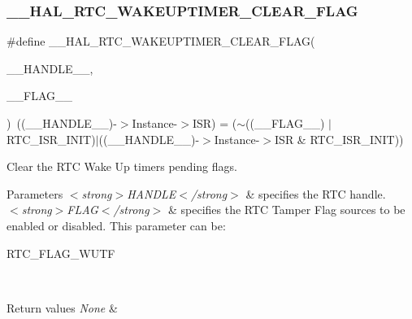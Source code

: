 \subsubsection{\texorpdfstring{\+\_\+\+\_\+\+H\+A\+L\+\_\+\+R\+T\+C\+\_\+\+W\+A\+K\+E\+U\+P\+T\+I\+M\+E\+R\+\_\+\+C\+L\+E\+A\+R\+\_\+\+F\+L\+AG}{\_\_HAL\_RTC\_WAKEUPTIMER\_CLEAR\_FLAG}}
{\footnotesize\ttfamily \#define \+\_\+\+\_\+\+H\+A\+L\+\_\+\+R\+T\+C\+\_\+\+W\+A\+K\+E\+U\+P\+T\+I\+M\+E\+R\+\_\+\+C\+L\+E\+A\+R\+\_\+\+F\+L\+AG(\begin{DoxyParamCaption}\item[{}]{\+\_\+\+\_\+\+H\+A\+N\+D\+L\+E\+\_\+\+\_\+,  }\item[{}]{\+\_\+\+\_\+\+F\+L\+A\+G\+\_\+\+\_\+ }\end{DoxyParamCaption})~((\+\_\+\+\_\+\+H\+A\+N\+D\+L\+E\+\_\+\+\_\+)-\/$>$Instance-\/$>$I\+SR) = ($\sim$((\+\_\+\+\_\+\+F\+L\+A\+G\+\_\+\+\_\+) $\vert$ R\+T\+C\+\_\+\+I\+S\+R\+\_\+\+I\+N\+IT)$\vert$((\+\_\+\+\_\+\+H\+A\+N\+D\+L\+E\+\_\+\+\_\+)-\/$>$Instance-\/$>$I\+SR \& R\+T\+C\+\_\+\+I\+S\+R\+\_\+\+I\+N\+IT))}



Clear the R\+TC Wake Up timer\textquotesingle{}s pending flags. 


\begin{DoxyParams}{Parameters}
{\em $<$strong$>$\+H\+A\+N\+D\+L\+E$<$/strong$>$} & specifies the R\+TC handle. \\
\hline
{\em $<$strong$>$\+F\+L\+A\+G$<$/strong$>$} & specifies the R\+TC Tamper Flag sources to be enabled or disabled. This parameter can be\+: \begin{DoxyItemize}
\item R\+T\+C\+\_\+\+F\+L\+A\+G\+\_\+\+W\+U\+TF \end{DoxyItemize}
\\
\hline
\end{DoxyParams}

\begin{DoxyRetVals}{Return values}
{\em None} & \\
\hline
\end{DoxyRetVals}
\mbox{\label{group___r_t_c_ex___wake_up___timer_ga18822c018d0b07be72ca315220bb02df}} 
